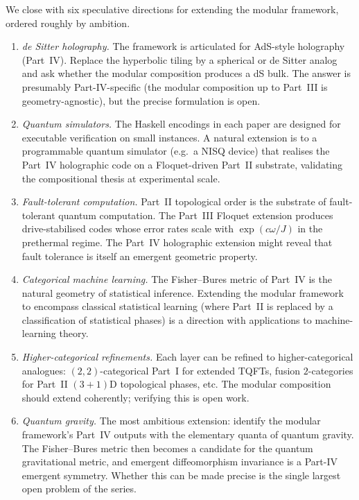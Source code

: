 \documentclass[12pt]{article}
\theoremstyle{definition}
\theoremstyle{remark}
\begin{document}
We close with six speculative directions for extending the modular
framework, ordered roughly by ambition.

\begin{enumerate}[label=\arabic*., leftmargin=2.4em]
\item \emph{de Sitter holography.} The framework is articulated for
AdS-style holography (Part~IV). Replace the hyperbolic tiling by a
spherical or de Sitter analog and ask whether the modular composition
produces a dS bulk. The answer is presumably Part-IV-specific (the
modular composition up to Part~III is geometry-agnostic), but the
precise formulation is open.

\item \emph{Quantum simulators.} The Haskell encodings in each paper
are designed for executable verification on small instances. A natural
extension is to a programmable quantum simulator (e.g.\ a NISQ device)
that realises the Part~IV holographic code on a Floquet-driven Part~II
substrate, validating the compositional thesis at experimental scale.

\item \emph{Fault-tolerant computation.} Part~II topological order is
the substrate of fault-tolerant quantum computation. The Part~III
Floquet extension produces drive-stabilised codes whose error rates
scale with $\exp(c \omega / J)$ in the prethermal regime. The Part~IV
holographic extension might reveal that fault tolerance is itself an
emergent geometric property.

\item \emph{Categorical machine learning.} The Fisher--Bures metric of
Part~IV is the natural geometry of statistical inference. Extending the
modular framework to encompass classical statistical learning (where
Part~II is replaced by a classification of statistical phases) is a
direction with applications to machine-learning theory.

\item \emph{Higher-categorical refinements.} Each layer can be refined
to higher-categorical analogues: $(2,2)$-categorical Part~I for
extended TQFTs, fusion $2$-categories for Part~II $(3{+}1)$D
topological phases, etc. The modular composition should extend
coherently; verifying this is open work.

\item \emph{Quantum gravity.} The most ambitious extension: identify
the modular framework's Part~IV outputs with the elementary quanta of
quantum gravity. The Fisher--Bures metric then becomes a candidate for
the quantum gravitational metric, and emergent diffeomorphism
invariance is a Part-IV emergent symmetry. Whether this can be made
precise is the single largest open problem of the series.
\end{enumerate}
\end{document}
